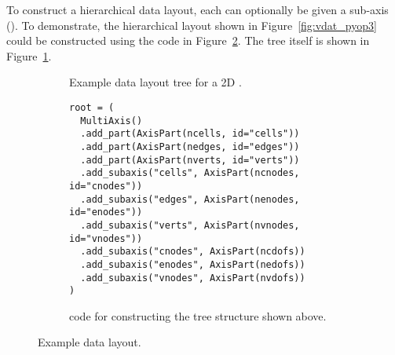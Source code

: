 To construct a hierarchical data layout, each  can optionally be given a sub-axis ().
To demonstrate, the hierarchical layout shown in Figure~\ref{fig:vdat_pyop3} could be constructed using the code in Figure~\ref{lis:demotreecode}.
The tree itself is shown in Figure~\ref{fig:vdat_tree}.

\begin{figure}
  \centering
  \begin{subfigure}{.9\textwidth}
    \centering
    \caption{Example data layout tree for a 2D .}
    \label{fig:vdat_tree}
  \end{subfigure}

  \begin{subfigure}{.9\textwidth}
    \begin{verbatim}
root = (
  MultiAxis()
  .add_part(AxisPart(ncells, id="cells"))
  .add_part(AxisPart(nedges, id="edges"))
  .add_part(AxisPart(nverts, id="verts"))
  .add_subaxis("cells", AxisPart(ncnodes, id="cnodes"))
  .add_subaxis("edges", AxisPart(nenodes, id="enodes"))
  .add_subaxis("verts", AxisPart(nvnodes, id="vnodes"))
  .add_subaxis("cnodes", AxisPart(ncdofs))
  .add_subaxis("enodes", AxisPart(nedofs))
  .add_subaxis("vnodes", AxisPart(nvdofs))
)
    \end{verbatim}
    \caption{ code for constructing the tree structure shown above.}
    \label{lis:demotreecode}
  \end{subfigure}
  \caption{Example data layout.}
  \label{fig:demotree}
\end{figure}


